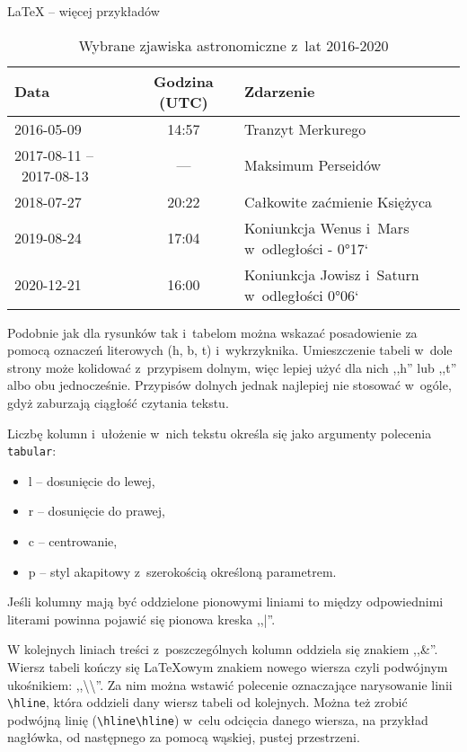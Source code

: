 \begin{easyappendix}{\LaTeX{} -- więcej przykładów}
\begin{table}[!ht]
	\caption{\label{tab:zjawiska}Wybrane zjawiska astronomiczne z~lat 2016-2020}
	\centering
	\begin{tabular}{p{2.5cm}c|l}
		Data        &   Godzina (UTC)   &   Zdarzenie\\\hline\hline
		2016-05-09  &   14:57           &   Tranzyt Merkurego\\\hline
		2017-08-11 --~2017-08-13  & --- &   Maksimum Perseidów \\\hline
		2018-07-27  &   20:22           &   Całkowite zaćmienie Księżyca\\\hline
		2019-08-24  &   17:04           &   Koniunkcja Wenus i~Mars w~odległości - 0°17`\\\hline
		2020-12-21  &   16:00           &   Koniunkcja Jowisz i~Saturn w~odległości 0°06`
	\end{tabular}
\end{table}

Podobnie jak dla rysunków tak i~tabelom można wskazać posadowienie za pomocą oznaczeń literowych (h, b, t) i~wykrzyknika. Umieszczenie tabeli w~dole strony może kolidować z~przypisem dolnym, więc lepiej użyć dla nich ,,h'' lub ,,t'' albo obu jednocześnie. Przypisów dolnych jednak najlepiej nie stosować w~ogóle, gdyż zaburzają ciągłość czytania tekstu.

 Liczbę kolumn i~ułożenie w~nich tekstu określa się jako argumenty polecenia \texttt{tabular}:
\begin{itemize}
	\item l -- dosunięcie do lewej,
	\item r -- dosunięcie do prawej,
	\item c -- centrowanie,
	\item p -- styl akapitowy z~szerokością określoną parametrem.
\end{itemize}
Jeśli kolumny mają być oddzielone pionowymi liniami to między odpowiednimi literami powinna pojawić się pionowa kreska ,,|''.

W kolejnych liniach treści z~poszczególnych kolumn oddziela się znakiem ,,\&''. Wiersz tabeli kończy się {\LaTeX}owym znakiem nowego wiersza czyli podwójnym ukośnikiem: ,,\textbackslash\textbackslash''. Za nim można wstawić polecenie oznaczające narysowanie linii \texttt{\textbackslash{}hline}, która oddzieli dany wiersz tabeli od kolejnych. Można też zrobić podwójną linię (\texttt{\textbackslash{}hline\textbackslash{}hline}) w~celu odcięcia danego wiersza, na przykład nagłówka, od następnego za pomocą wąskiej, pustej przestrzeni.


\end{easyappendix}
